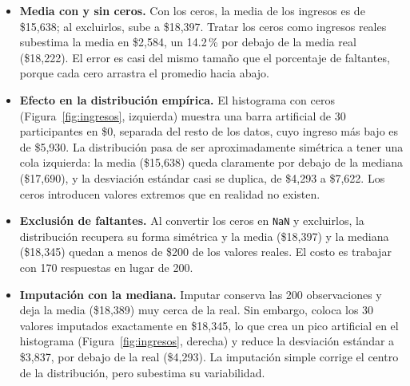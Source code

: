 \documentclass[11pt,letterpaper]{article}
\begin{document}

\begin{itemize}
    \item \textbf{Media con y sin ceros.} Con los ceros, la media de los ingresos es de \$15,638; al excluirlos, sube a \$18,397. Tratar los ceros como ingresos reales subestima la media en \$2,584, un 14.2\,\% por debajo de la media real (\$18,222). El error es casi del mismo tamaño que el porcentaje de faltantes, porque cada cero arrastra el promedio hacia abajo.
    \item \textbf{Efecto en la distribución empírica.} El histograma con ceros (Figura~\ref{fig:ingresos}, izquierda) muestra una barra artificial de 30 participantes en \$0, separada del resto de los datos, cuyo ingreso más bajo es de \$5,930. La distribución pasa de ser aproximadamente simétrica a tener una cola izquierda: la media (\$15,638) queda claramente por debajo de la mediana (\$17,690), y la desviación estándar casi se duplica, de \$4,293 a \$7,622. Los ceros introducen valores extremos que en realidad no existen.
    \item \textbf{Exclusión de faltantes.} Al convertir los ceros en \texttt{NaN} y excluirlos, la distribución recupera su forma simétrica y la media (\$18,397) y la mediana (\$18,345) quedan a menos de \$200 de los valores reales. El costo es trabajar con 170 respuestas en lugar de 200.
    \item \textbf{Imputación con la mediana.} Imputar conserva las 200 observaciones y deja la media (\$18,389) muy cerca de la real. Sin embargo, coloca los 30 valores imputados exactamente en \$18,345, lo que crea un pico artificial en el histograma (Figura~\ref{fig:ingresos}, derecha) y reduce la desviación estándar a \$3,837, por debajo de la real (\$4,293). La imputación simple corrige el centro de la distribución, pero subestima su variabilidad.
\end{itemize}
\end{document}
